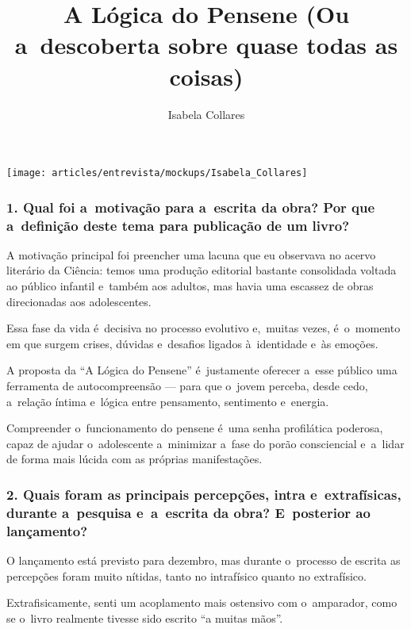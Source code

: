 \documentclass{gescons}
\author{Isabela Collares}
\title{A Lógica do Pensene (Ou a~descoberta sobre quase todas as coisas)}
\begin{document}
    \makeentrevistatitle

    \begin{multicols}{3}

\begin{center}
    \texttt{[image: articles/entrevista/mockups/Isabela\_Collares]}
\end{center}
\vspace{-1cm}


\subsubsection{1. Qual foi a~motivação para a~escrita da obra? Por que a~definição deste tema para publicação de um livro?}

\sloppy

A motivação principal foi preencher uma lacuna que eu observava no acervo literário da Ciência: temos uma produção editorial bastante consolidada voltada ao público infantil e~também aos adultos, mas havia uma escassez de obras direcionadas aos adolescentes.

\fussy

Essa fase da vida é~decisiva no processo evolutivo e,~muitas vezes, é~o~momento em que surgem crises, dúvidas e~desafios ligados à~identidade e~às emoções.

A proposta da ``A Lógica do Pensene'' é~justamente oferecer a~esse público uma ferramenta de autocompreensão --- para que o~jovem perceba, desde cedo, a~relação íntima e~lógica entre pensamento, sentimento e~energia.

Compreender o~funcionamento do pensene é~uma senha profilática poderosa, capaz de ajudar o~adolescente a~minimizar a~fase do porão consciencial e~a~lidar de forma mais lúcida com as próprias manifestações.


\subsubsection{2. Quais foram as principais percepções, intra e~extrafísicas, durante a~pesquisa e~a~escrita da obra? E~posterior ao lançamento?}

O lançamento está previsto para dezembro, mas durante o~processo de escrita as percepções foram muito nítidas, tanto no intrafísico quanto no extrafísico.

Extrafisicamente, senti um acoplamento mais ostensivo com o~amparador, como se o~livro realmente tivesse sido escrito ``a muitas mãos''.


\end{multicols}
\end{document}
